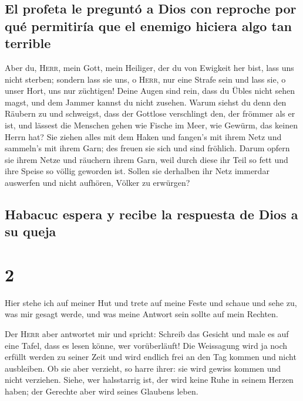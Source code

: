 \hypertarget{el-profeta-le-preguntuxf3-a-dios-con-reproche-por-quuxe9-permitiruxeda-que-el-enemigo-hiciera-algo-tan-terrible}{%
\subsection{El profeta le preguntó a Dios con reproche por qué
permitiría que el enemigo hiciera algo tan
terrible}\label{el-profeta-le-preguntuxf3-a-dios-con-reproche-por-quuxe9-permitiruxeda-que-el-enemigo-hiciera-algo-tan-terrible}}

 Aber du, \textsc{Herr}, mein Gott, mein Heiliger, der du
von Ewigkeit her bist, lass uns nicht sterben; sondern lass sie uns, o
\textsc{Herr}, nur eine Strafe sein und lass sie, o unser Hort, uns nur
züchtigen!  Deine Augen sind rein, dass du Übles nicht
sehen magst, und dem Jammer kannst du nicht zusehen. Warum siehst du
denn den Räubern zu und schweigst, dass der Gottlose verschlingt den,
der frömmer als er ist,  und lässest die Menschen gehen
wie Fische im Meer, wie Gewürm, das keinen Herrn hat? 
Sie ziehen alles mit dem Haken und fangen's mit ihrem Netz und sammeln's
mit ihrem Garn; des freuen sie sich und sind fröhlich. 
Darum opfern sie ihrem Netze und räuchern ihrem Garn, weil durch diese
ihr Teil so fett und ihre Speise so völlig geworden ist. 
Sollen sie derhalben ihr Netz immerdar auswerfen und nicht aufhören,
Völker zu erwürgen?

\hypertarget{habacuc-espera-y-recibe-la-respuesta-de-dios-a-su-queja}{%
\subsection{Habacuc espera y recibe la respuesta de Dios a su
queja}\label{habacuc-espera-y-recibe-la-respuesta-de-dios-a-su-queja}}

\hypertarget{section-1}{%
\section{2}\label{section-1}}

 Hier stehe ich auf meiner Hut und trete auf meine Feste
und schaue und sehe zu, was mir gesagt werde, und was meine Antwort sein
sollte auf mein Rechten.

 Der \textsc{Herr} aber antwortet mir und spricht: Schreib
das Gesicht und male es auf eine Tafel, dass es lesen könne, wer
vorüberläuft!  Die Weissagung wird ja noch erfüllt werden
zu seiner Zeit und wird endlich frei an den Tag kommen und nicht
ausbleiben. Ob sie aber verzieht, so harre ihrer: sie wird gewiss kommen
und nicht verziehen.  Siehe, wer halsstarrig ist, der wird
keine Ruhe in seinem Herzen haben; der Gerechte aber wird seines
Glaubens leben.


